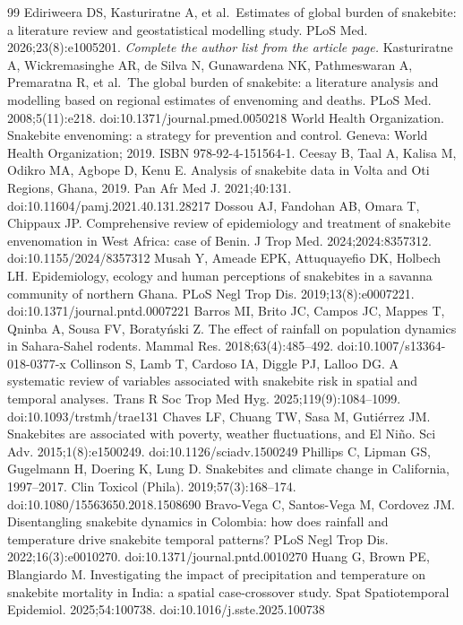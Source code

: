 \documentclass[11pt,a4paper]{article}
\begin{document}
\begin{thebibliography}{99}
 Ediriweera DS, Kasturiratne A, et al.~Estimates of global burden of snakebite: a literature review and geostatistical modelling study. PLoS Med. 2026;23(8):e1005201. \emph{Complete the author list from the article page.}
 Kasturiratne A, Wickremasinghe AR, de Silva N, Gunawardena NK, Pathmeswaran A, Premaratna R, et al.~The global burden of snakebite: a literature analysis and modelling based on regional estimates of envenoming and deaths. PLoS Med. 2008;5(11):e218. doi:10.1371/journal.pmed.0050218
 World Health Organization. Snakebite envenoming: a strategy for prevention and control. Geneva: World Health Organization; 2019. ISBN 978-92-4-151564-1.
 Ceesay B, Taal A, Kalisa M, Odikro MA, Agbope D, Kenu E. Analysis of snakebite data in Volta and Oti Regions, Ghana, 2019. Pan Afr Med J. 2021;40:131. doi:10.11604/pamj.2021.40.131.28217
 Dossou AJ, Fandohan AB, Omara T, Chippaux JP. Comprehensive review of epidemiology and treatment of snakebite envenomation in West Africa: case of Benin. J Trop Med. 2024;2024:8357312. doi:10.1155/2024/8357312
 Musah Y, Ameade EPK, Attuquayefio DK, Holbech LH. Epidemiology, ecology and human perceptions of snakebites in a savanna community of northern Ghana. PLoS Negl Trop Dis. 2019;13(8):e0007221. doi:10.1371/journal.pntd.0007221
 Barros MI, Brito JC, Campos JC, Mappes T, Qninba A, Sousa FV, Boratyński Z. The effect of rainfall on population dynamics in Sahara-Sahel rodents. Mammal Res. 2018;63(4):485--492. doi:10.1007/s13364-018-0377-x
 Collinson S, Lamb T, Cardoso IA, Diggle PJ, Lalloo DG. A systematic review of variables associated with snakebite risk in spatial and temporal analyses. Trans R Soc Trop Med Hyg. 2025;119(9):1084--1099. doi:10.1093/trstmh/trae131
 Chaves LF, Chuang TW, Sasa M, Gutiérrez JM. Snakebites are associated with poverty, weather fluctuations, and El Niño. Sci Adv. 2015;1(8):e1500249. doi:10.1126/sciadv.1500249
 Phillips C, Lipman GS, Gugelmann H, Doering K, Lung D. Snakebites and climate change in California, 1997--2017. Clin Toxicol (Phila). 2019;57(3):168--174. doi:10.1080/15563650.2018.1508690
 Bravo-Vega C, Santos-Vega M, Cordovez JM. Disentangling snakebite dynamics in Colombia: how does rainfall and temperature drive snakebite temporal patterns? PLoS Negl Trop Dis. 2022;16(3):e0010270. doi:10.1371/journal.pntd.0010270
 Huang G, Brown PE, Blangiardo M. Investigating the impact of precipitation and temperature on snakebite mortality in India: a spatial case-crossover study. Spat Spatiotemporal Epidemiol. 2025;54:100738. doi:10.1016/j.sste.2025.100738

\end{thebibliography}
\end{document}
